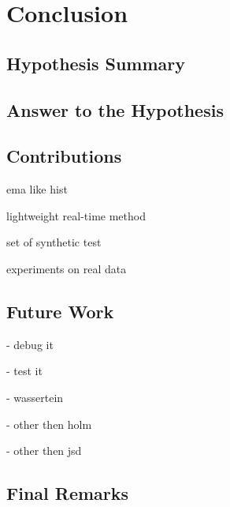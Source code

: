 \chapter{Conclusion} \label{chap:conclusion} \minitoc

\section{Hypothesis Summary}
\section{Answer to the Hypothesis}
\section{Contributions}
ema like hist

lightweight real-time method

set of synthetic test

experiments on real data

\section{Future Work}

- debug it

- test it

- wassertein

- other then holm

- other then jsd

\section{Final Remarks}